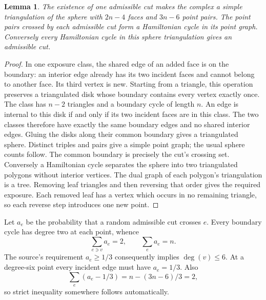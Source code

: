 \documentclass[11pt]{article}
\newtheorem{lemma}{Lemma}
\begin{document}
\begin{lemma}\label{lem:hamilton-reduction}
The existence of one admissible cut makes the complex a simple
triangulation of the sphere with $2n-4$ faces and $3n-6$ point pairs.
The point pairs crossed by each admissible cut form a Hamiltonian cycle
in its point graph. Conversely every Hamiltonian cycle in this sphere
triangulation gives an admissible cut.
\end{lemma}
\begin{proof}
In one exposure class, the shared edge of an added face is on the boundary:
an interior edge already has its two incident faces and cannot belong to
another face. Its third vertex is new. Starting from a triangle, this
operation preserves a triangulated disk whose boundary contains every
vertex exactly once. The class has $n-2$ triangles and a boundary cycle
of length $n$. An edge is internal to this disk if and only if its two
incident faces are in this class. The two classes therefore have exactly
the same boundary edges and no shared interior edges. Gluing the disks
along their common boundary gives a triangulated sphere. Distinct triples
and pairs give a simple point graph; the usual sphere counts follow.
The common boundary is precisely the cut's crossing set.
Conversely a Hamiltonian cycle separates the sphere into two triangulated
polygons without interior vertices. The dual graph of each polygon's
triangulation is a tree. Removing leaf triangles and then reversing that
order gives the required exposure. Each removed leaf has a vertex which
occurs in no remaining triangle, so each reverse step introduces one
new point.
\end{proof}

Let $a_e$ be the probability that a random admissible cut crosses $e$.
Every boundary cycle has degree two at each point, whence
\[
 \sum_{e\ni v}a_e=2,\qquad \sum_ea_e=n.
\]
The source's requirement $a_e\ge1/3$ consequently implies
$\deg(v)\le6$. At a degree-six point every incident edge must have
$a_e=1/3$. Also
\[
 \sum_e(a_e-1/3)=n-(3n-6)/3=2,
\]
so strict inequality somewhere follows automatically.
\end{document}
